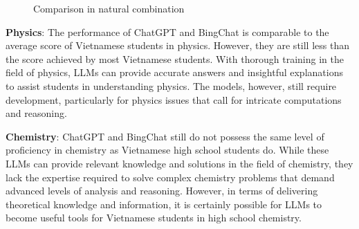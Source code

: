 \documentclass{article}
\begin{document}
{\begin{figure}[ht!]
\begin{center}
		\end{center}
		\caption{Comparison in natural combination}
		\label{fig:natural combination}
	\end{figure}
	
	\textbf{Physics}: The performance of ChatGPT and BingChat is comparable to the average score of Vietnamese students in physics. However, they are still less than the score achieved by most Vietnamese students. With thorough training in the field of physics, LLMs can provide accurate answers and insightful explanations to assist students in understanding physics. The models, however, still require development, particularly for physics issues that call for intricate computations and reasoning.
	
	\textbf{Chemistry}: ChatGPT and BingChat still do not possess the same level of proficiency in chemistry as Vietnamese high school students do. While these LLMs can provide relevant knowledge and solutions in the field of chemistry, they lack the expertise required to solve complex chemistry problems that demand advanced levels of analysis and reasoning. However, in terms of delivering theoretical knowledge and information, it is certainly possible for LLMs to become useful tools for Vietnamese students in high school chemistry.
	
}
\end{document}
